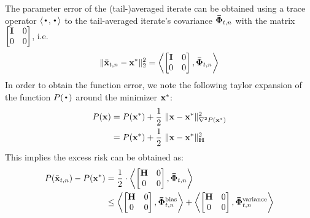 The parameter error of the (tail-)averaged iterate can be obtained using a trace operator 
$\iprod{{\Bigcdot}}{{\Bigcdot}}$ to the tail-averaged iterate's covariance $\phivb_{t,n}$ with the matrix $\begin{bmatrix}\mathbf{I}&0\\0&0\end{bmatrix}$, i.e. 
\begin{align*}
\|\bar{\mathbf{x}}_{t,n}-\mathbf{x}^*\|_2^2=\left\langle \begin{bmatrix}\mathbf{I} & 0\\ 0 & 0\end{bmatrix}, \boldsymbol{\bar{\Phi}}_{t,n} \right\rangle
\end{align*}
In order to obtain the function error, we note the following taylor expansion of the function $P(\Bigcdot)$ around the minimizer $\mathbf{x}^*$:
\begin{align*}
P(\mathbf{x})&=P(\mathbf{x}^*) + \frac{1}{2}\ \|\mathbf{x}-\mathbf{x}^*\|_{\nabla^2P(\mathbf{x}^*)}^2\\
&=P(\mathbf{x}^*) + \frac{1}{2}\ \|\mathbf{x}-\mathbf{x}^*\|_{\mathbf{H}}^2
\end{align*}
This implies the excess risk can be obtained as:
\begin{align*}
P(\bar{\mathbf{x}}_{t,n})-P(\mathbf{x}^*)&=\frac{1}{2}\cdot\left\langle \begin{bmatrix}\mathbf{H} & 0\\ 0 & 0\end{bmatrix}, \boldsymbol{\bar{\Phi}}_{t,n} \right\rangle\\
&\leq\left\langle \begin{bmatrix}\mathbf{H} & 0\\ 0 & 0\end{bmatrix}, \boldsymbol{\bar{\Phi}}^{\text{bias}}_{t,n} \right\rangle+\left\langle \begin{bmatrix}\mathbf{H} & 0\\ 0 & 0\end{bmatrix}, \boldsymbol{\bar{\Phi}}^{\text{variance}}_{t,n} \right\rangle
\end{align*}
\iffalse
We wrap up this section by noting that the function error or parameter error (respectively) can be obtained by applying the trace operator $\iprod{{\Bigcdot}}{{\Bigcdot}}$ to the tail-averaged iterate's covariance $\phivb_{t,n}$: $\iprod{\begin{bmatrix}\H & 0\\ 0 & 0\end{bmatrix}}{\phivb_{t,n}}$ or $\iprod{\begin{bmatrix}\eye & 0\\ 0 & 0\end{bmatrix}}{\phivb_{t,n}}$. 
\fi

